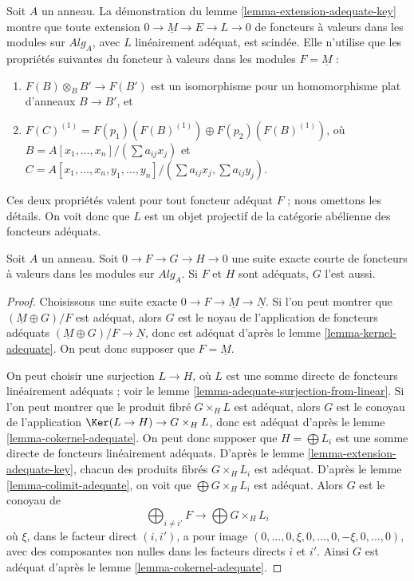 \begin{remark}
\label{remark-linearly-adequate}
Soit $A$ un anneau.
La démonstration du
lemme \ref{lemma-extension-adequate-key}
montre que toute extension $0 \to \underline{M} \to E \to L \to 0$
de foncteurs à valeurs dans les modules sur $\textit{Alg}_A$,
avec $L$ linéairement adéquat, est scindée. Elle n'utilise que les propriétés suivantes
du foncteur à valeurs dans les modules $F = \underline{M}$ :
\begin{enumerate}
\item $F(B) \otimes_B B' \to F(B')$ est un isomorphisme
pour un homomorphisme plat d'anneaux $B \to B'$, et
\item
$F(C)^{(1)} = F(p_1)(F(B)^{(1)}) \oplus F(p_2)(F(B)^{(1)})$,
où $B = A[x_1, \ldots, x_n]/(\sum a_{ij}x_j)$ et
$C = A[x_1, \ldots, x_n, y_1, \ldots, y_n]/
(\sum a_{ij}x_j, \sum a_{ij}y_j)$.
\end{enumerate}
Ces deux propriétés valent pour tout foncteur adéquat $F$ ; nous omettons les détails.
On voit donc que $L$ est un objet projectif de la catégorie abélienne des
foncteurs adéquats.
\end{remark}

\begin{lemma}
\label{lemma-extension-adequate}
Soit $A$ un anneau.
Soit $0 \to F \to G \to H \to 0$ une suite exacte courte de
foncteurs à valeurs dans les modules sur $\textit{Alg}_A$.
Si $F$ et $H$ sont adéquats, $G$ l'est aussi.
\end{lemma}

\begin{proof}
Choisissons une suite exacte $0 \to F \to \underline{M} \to \underline{N}$.
Si l'on peut montrer que $(\underline{M} \oplus G)/F$ est adéquat, alors
$G$ est le noyau de l'application de foncteurs adéquats
$(\underline{M} \oplus G)/F \to \underline{N}$, donc est
adéquat d'après le
lemme \ref{lemma-kernel-adequate}.
On peut donc supposer que $F = \underline{M}$.

\medskip\noindent
On peut choisir une surjection $L \to H$, où $L$ est une somme directe de
foncteurs linéairement adéquats ; voir le
lemme \ref{lemma-adequate-surjection-from-linear}.
Si l'on peut montrer que le produit fibré $G \times_H L$ est adéquat, alors
$G$ est le conoyau de l'application $\Ker(L \to H) \to G \times_H L$,
donc est adéquat d'après le
lemme \ref{lemma-cokernel-adequate}.
On peut donc supposer que $H = \bigoplus L_i$ est une somme directe de
foncteurs linéairement adéquats. D'après le
lemme \ref{lemma-extension-adequate-key},
chacun des produits fibrés $G \times_H L_i$ est adéquat. D'après le
lemme \ref{lemma-colimit-adequate},
on voit que $\bigoplus G \times_H L_i$ est adéquat.
Alors $G$ est le conoyau de
$$
\bigoplus\nolimits_{i \not = i'} F \longrightarrow
\bigoplus G \times_H L_i
$$
où $\xi$, dans le facteur direct $(i, i')$, a pour image
$(0, \ldots, 0, \xi, 0, \ldots, 0, -\xi, 0, \ldots, 0)$,
avec des composantes non nulles dans les facteurs directs $i$ et $i'$.
Ainsi $G$ est adéquat d'après le
lemme \ref{lemma-cokernel-adequate}.
\end{proof}

